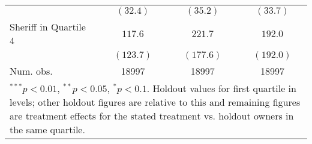 \begin{table}[htb]
\begin{center}
\begin{tabular}{l c c c }
                      & $(32.4)$      & $(35.2)$       & $(33.7)$       \\
Sheriff in Quartile 4 & $117.6$       & $221.7$        & $192.0$        \\
                      & $(123.7)$     & $(177.6)$      & $(192.0)$      \\
\hline
Num. obs.             & 18997         & 18997          & 18997          \\
\hline
\multicolumn{4}{l}{\scriptsize{\parbox{.75\linewidth}{$^{***}p<0.01$, $^{**}p<0.05$, $^*p<0.1$. Holdout values for first quartile in levels; other holdout figures are relative to this and remaining figures are treatment effects for the stated treatment vs. holdout owners in the same quartile.}}}
\end{tabular}
\label{tbl:lpm_hetero}
\end{center}
\end{table}

